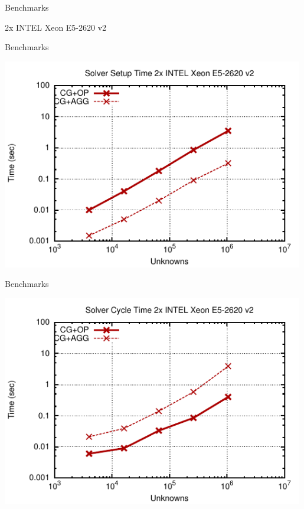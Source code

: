 \begin{frame}{Benchmarks}
  \begin{center}
   2x INTEL Xeon E5-2620 v2
  \end{center}
\end{frame}
\begin{frame}{Benchmarks}
  \begin{center}
   \includegraphics[width=0.99\textwidth]{figures/cpu-setup.pdf}
  \end{center}
\end{frame}
\begin{frame}{Benchmarks}
  \begin{center}
   \includegraphics[width=0.99\textwidth]{figures/cpu-cycle.pdf}
  \end{center}
\end{frame}
